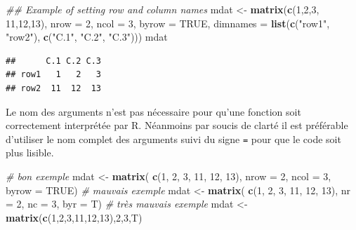 \documentclass[
]{book}
\newenvironment{Shaded}{\begin{snugshade}}{\end{snugshade}}
\newcommand{\CommentTok}[1]{\textcolor[rgb]{0.56,0.35,0.01}{\textit{#1}}}
\newcommand{\DataTypeTok}[1]{\textcolor[rgb]{0.13,0.29,0.53}{#1}}
\newcommand{\DecValTok}[1]{\textcolor[rgb]{0.00,0.00,0.81}{#1}}
\newcommand{\KeywordTok}[1]{\textcolor[rgb]{0.13,0.29,0.53}{\textbf{#1}}}
\newcommand{\NormalTok}[1]{#1}
\newcommand{\OtherTok}[1]{\textcolor[rgb]{0.56,0.35,0.01}{#1}}
\newcommand{\StringTok}[1]{\textcolor[rgb]{0.31,0.60,0.02}{#1}}
\begin{document}
\begin{Shaded}
\begin{Highlighting}[]
\CommentTok{## Example of setting row and column names}
\NormalTok{mdat <-}\StringTok{ }\KeywordTok{matrix}\NormalTok{(}\KeywordTok{c}\NormalTok{(}\DecValTok{1}\NormalTok{,}\DecValTok{2}\NormalTok{,}\DecValTok{3}\NormalTok{, }\DecValTok{11}\NormalTok{,}\DecValTok{12}\NormalTok{,}\DecValTok{13}\NormalTok{), }\DataTypeTok{nrow =} \DecValTok{2}\NormalTok{, }\DataTypeTok{ncol =} \DecValTok{3}\NormalTok{, }\DataTypeTok{byrow =} \OtherTok{TRUE}\NormalTok{,}
               \DataTypeTok{dimnames =} \KeywordTok{list}\NormalTok{(}\KeywordTok{c}\NormalTok{(}\StringTok{"row1"}\NormalTok{, }\StringTok{"row2"}\NormalTok{),}
                               \KeywordTok{c}\NormalTok{(}\StringTok{"C.1"}\NormalTok{, }\StringTok{"C.2"}\NormalTok{, }\StringTok{"C.3"}\NormalTok{)))}
\NormalTok{mdat}
\end{Highlighting}
\end{Shaded}

\begin{verbatim}
##      C.1 C.2 C.3
## row1   1   2   3
## row2  11  12  13
\end{verbatim}

Le nom des arguments n'est pas nécessaire pour qu'une fonction soit correctement interprétée par R. Néanmoins par soucis de clarté il est préférable d'utiliser le nom complet des arguments suivi du signe \texttt{=} pour que le code soit plus lisible.

\begin{Shaded}
\begin{Highlighting}[]
\CommentTok{# bon exemple}
\NormalTok{mdat <-}\StringTok{ }\KeywordTok{matrix}\NormalTok{(}
  \KeywordTok{c}\NormalTok{(}\DecValTok{1}\NormalTok{, }\DecValTok{2}\NormalTok{, }\DecValTok{3}\NormalTok{, }\DecValTok{11}\NormalTok{, }\DecValTok{12}\NormalTok{, }\DecValTok{13}\NormalTok{), }
  \DataTypeTok{nrow =} \DecValTok{2}\NormalTok{, }\DataTypeTok{ncol =} \DecValTok{3}\NormalTok{, }
  \DataTypeTok{byrow =} \OtherTok{TRUE}\NormalTok{)}
\CommentTok{# mauvais exemple}
\NormalTok{mdat <-}\StringTok{ }\KeywordTok{matrix}\NormalTok{(}
  \KeywordTok{c}\NormalTok{(}\DecValTok{1}\NormalTok{, }\DecValTok{2}\NormalTok{, }\DecValTok{3}\NormalTok{, }\DecValTok{11}\NormalTok{, }\DecValTok{12}\NormalTok{, }\DecValTok{13}\NormalTok{), }
  \DataTypeTok{nr =} \DecValTok{2}\NormalTok{, }\DataTypeTok{nc =} \DecValTok{3}\NormalTok{, }
  \DataTypeTok{byr =}\NormalTok{ T)}
\CommentTok{# très mauvais exemple}
\NormalTok{mdat <-}\StringTok{ }\KeywordTok{matrix}\NormalTok{(}\KeywordTok{c}\NormalTok{(}\DecValTok{1}\NormalTok{,}\DecValTok{2}\NormalTok{,}\DecValTok{3}\NormalTok{,}\DecValTok{11}\NormalTok{,}\DecValTok{12}\NormalTok{,}\DecValTok{13}\NormalTok{),}\DecValTok{2}\NormalTok{,}\DecValTok{3}\NormalTok{,T)}
\end{Highlighting}
\end{Shaded}
\end{document}
